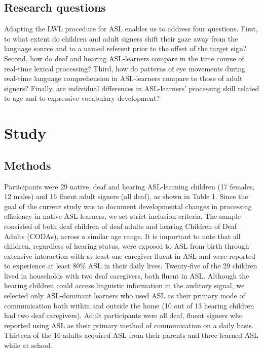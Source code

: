 \documentclass[oneside]{report}
\begin{document}
\subsection{Research questions}\label{research-questions}

Adapting the LWL procedure for ASL enables us to address four questions.
First, to what extent do children and adult signers shift their gaze
away from the language source and to a named referent prior to the
offset of the target sign? Second, how do deaf and hearing ASL-learners
compare in the time course of real-time lexical processing? Third, how
do patterns of eye movements during real-time language comprehension in
ASL-learners compare to those of adult signers? Finally, are individual
differences in ASL-learners' processing skill related to age and to
expressive vocabulary development?

\section{Study}\label{study}

\subsection{Methods}\label{methods}

Participants were 29 native, deaf and hearing ASL-learning children (17
females, 12 males) and 16 fluent adult signers (all deaf), as shown in
Table 1. Since the goal of the current study was to document
developmental changes in processing efficiency in native ASL-learners,
we set strict inclusion criteria. The sample consisted of both deaf
children of deaf adults and hearing Children of Deaf Adults (CODAs),
across a similar age range. It is important to note that all children,
regardless of hearing status, were exposed to ASL from birth through
extensive interaction with at least one caregiver fluent in ASL and were
reported to experience at least 80\% ASL in their daily lives.
Twenty-five of the 29 children lived in households with two deaf
caregivers, both fluent in ASL. Although the hearing children could
access linguistic information in the auditory signal, we selected only
ASL-dominant learners who used ASL as their primary mode of
communication both within and outside the home (10 out of 13 hearing
children had two deaf caregivers). Adult participants were all deaf,
fluent signers who reported using ASL as their primary method of
communication on a daily basis. Thirteen of the 16 adults acquired ASL
from their parents and three learned ASL while at school.
\end{document}
